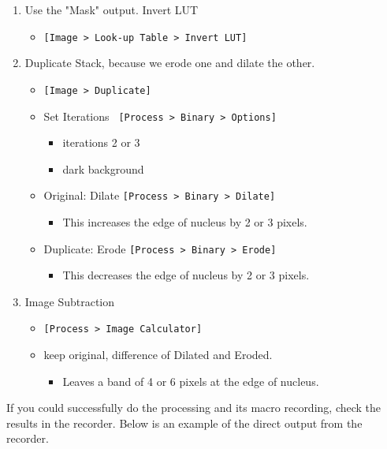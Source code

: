 \documentclass[11pt,a4paper,oneside]{report}
\newcommand{\ijmenu}[1]{\texttt{\small#1}}
\begin{document}
\begin{enumerate}
  \item Use the "Mask" output. Invert LUT
  \begin{itemize}
    \item \ijmenu{[Image > Look-up Table > Invert LUT]}
  \end{itemize}
  \item Duplicate Stack, because we erode one and dilate the other.
  \begin{itemize}
    \item \ijmenu{[Image > Duplicate]}
    \item Set Iterations \ijmenu{ [Process > Binary > Options]}
    \begin{itemize}
      \item iterations 2 or 3
      \item dark background
    \end{itemize}
    \item Original: Dilate \ijmenu{[Process > Binary > Dilate]}
    \begin{itemize}
      \item This increases the edge of nucleus by 2 or 3 pixels. 
    \end{itemize}
    \item Duplicate: Erode \ijmenu{[Process > Binary > Erode]}
    \begin{itemize}
      \item This decreases the edge of nucleus by 2 or 3 pixels. 
    \end{itemize}
  \end{itemize}
  \item Image Subtraction
  \begin{itemize}
    \item \ijmenu{[Process > Image Calculator]}
    \item keep original, difference of Dilated and Eroded.
    \begin{itemize}
      \item Leaves a band of 4 or 6 pixels at the edge of nucleus. 
    \end{itemize} 
  \end{itemize}
\end{enumerate}

If you could successfully do the processing and its macro recording, check the results in the recorder. Below is an example of the direct output from the recorder. 
\end{document}
